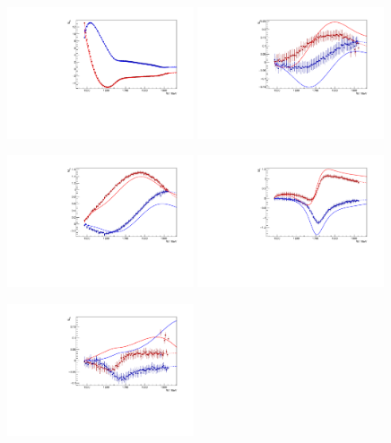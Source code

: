\documentclass[a4paper,12pt]{report}
\begin{document}
\begin{figure}
  \begin{center}
    \centerline{
    \includegraphics[width=0.49\textwidth]{MAID/PenHeli/plots.0/E0p.pdf}
    \includegraphics[width=0.49\textwidth]{MAID/PenHeli/plots.0/E1p.pdf}
    }
    \centerline{
    \includegraphics[width=0.49\textwidth]{MAID/PenHeli/plots.0/M1p.pdf}
    \includegraphics[width=0.49\textwidth]{MAID/PenHeli/plots.0/M1m.pdf}
    }
    \centerline{
    \includegraphics[width=0.49\textwidth]{MAID/PenHeli/plots.0/E2p.pdf}
}
\end{center}
\end{figure}
\end{document}
